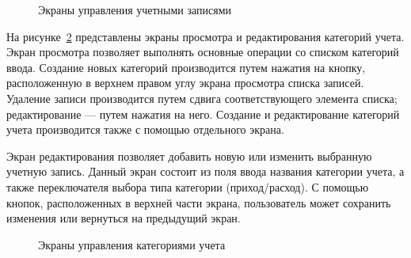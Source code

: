 \begin{figure}[h!]
  \centering
  \caption{Экраны управления учетными записями}
  \label{fig:implementation_ui_activity_account}
\end{figure}

На рисунке~\ref{fig:implementation_ui_activity_category}
представлены экраны просмотра и редактирования категорий учета.
Экран просмотра позволяет выполнять основные операции
со списком категорий ввода.
Создание новых категорий производится путем нажатия на кнопку,
расположенную в верхнем правом углу экрана просмотра списка записей.
Удаление записи производится путем сдвига соответствующего элемента списка;
редактирование --- путем нажатия на него.
Создание и редактирование категорий учета производится также
с помощью отдельного экрана.

Экран редактирования позволяет добавить новую или изменить выбранную
учетную запись. Данный экран состоит из поля ввода названия категории учета,
а также переключателя выбора типа категории (приход/расход).
С помощью кнопок, расположенных в верхней части экрана, пользователь
может сохранить изменения или вернуться на предыдущий экран.

\begin{figure}[h!]
  \centering
  \caption{Экраны управления категориями учета}
  \label{fig:implementation_ui_activity_category}
\end{figure}

